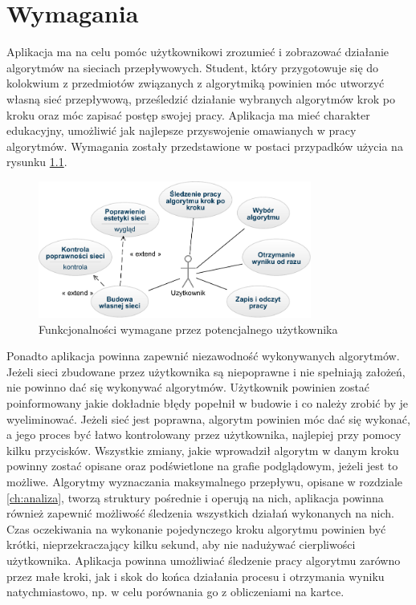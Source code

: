 \chapter{Wymagania}\label{chap:wymagania}
Aplikacja ma na celu pomóc użytkownikowi zrozumieć i zobrazować działanie algorytmów na sieciach przepływowych. Student, który przygotowuje się do kolokwium z przedmiotów związanych z algorytmiką powinien móc utworzyć własną sieć przepływową, prześledzić działanie wybranych algorytmów krok po kroku oraz móc zapisać postęp swojej pracy. Aplikacja ma mieć charakter edukacyjny, umożliwić jak najlepsze przyswojenie omawianych w pracy algorytmów. Wymagania zostały przedstawione w postaci przypadków użycia na rysunku \ref{fig:userCases}.
\begin{figure}[H]
	\centering
	\includegraphics[width=0.8\textwidth]{./img/user_case2}
	\caption{Funkcjonalności wymagane przez potencjalnego użytkownika}
	\label{fig:userCases}
\end{figure}
Ponadto aplikacja powinna zapewnić niezawodność wykonywanych algorytmów. Jeżeli sieci zbudowane przez użytkownika są niepoprawne i nie spełniają założeń, nie powinno dać się wykonywać algorytmów. Użytkownik powinien zostać poinformowany jakie dokładnie błędy popełnił w budowie i co należy zrobić by je wyeliminować. Jeżeli sieć jest poprawna, algorytm powinien móc dać się wykonać, a jego proces być łatwo kontrolowany przez użytkownika, najlepiej przy pomocy kilku przycisków. Wszystkie zmiany, jakie wprowadził algorytm w danym kroku powinny zostać opisane oraz podświetlone na grafie podglądowym, jeżeli jest to możliwe. Algorytmy wyznaczania maksymalnego przepływu, opisane w rozdziale \ref{ch:analiza}, tworzą struktury pośrednie i operują na nich, aplikacja powinna również zapewnić możliwość śledzenia wszystkich działań wykonanych na nich.\\\indent
Czas oczekiwania na wykonanie pojedynczego kroku algorytmu powinien być krótki, nieprzekraczający kilku sekund, aby nie nadużywać cierpliwości użytkownika. Aplikacja powinna umożliwiać śledzenie pracy algorytmu zarówno przez małe kroki, jak i skok do końca działania procesu i otrzymania wyniku natychmiastowo, np. w celu porównania go z obliczeniami na kartce.